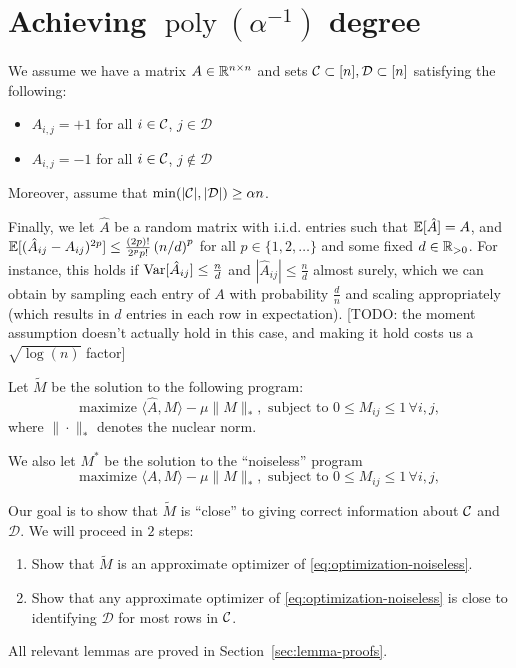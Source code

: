 \documentclass[11pt]{article}
\newcommand{\M}{\tilde{M}}
\newcommand{\A}{\hat{A}}
\DeclareMathOperator{\poly}{poly}
\newcommand{\sD}{\mathcal{D}}
\newcommand{\todo}[1]{{\color{red} [TODO: {#1}]}}
\begin{document}
\section{Achieving $\poly(\alpha^{-1})$ degree}
We assume we have a matrix $A \in \mathbb{R}^{n \times n}$ and sets 
$\sC \subset [n], \sD \subset [n]$ satisfying the following:
\begin{itemize}
\item $A_{i,j} = +1$ for all $i \in \mathcal{C}$, $j \in \sD$
\item $A_{i,j} = -1$ for all $i \in \mathcal{C}$, $j \not\in \sD$
\end{itemize}
Moreover, assume that $\min(|\sC|, |\sD|) \geq \alpha n$.

Finally, we let $\A$ be a random matrix with i.i.d. entries such that $\bE[\A] = A$, 
and $\bE[(\A_{ij}-A_{ij})^{2p}] \leq \frac{(2p)!}{2^pp!} \p{n/d}^{p}$ for all $p \in \{1,2,\ldots\}$ 
and some fixed $d \in \mathbb{R}_{>0}$. For instance, this holds if $\Var[\A_{ij}] \leq \frac{n}{d}$ and $|\A_{ij}| \leq \frac{n}{d}$ almost surely, 
which we can obtain by sampling each entry of $A$ with probability $\frac{d}{n}$ and scaling appropriately (which results in $d$ entries in 
each row in expectation).
\todo{the moment assumption doesn't actually hold in this case, and making it hold costs us a $\sqrt{\log(n)}$ factor}

Let $\M$ be the solution to the following program:
\begin{equation}
\label{eq:optimization-noisy}
\text{maximize } \langle \A, M \rangle - \mu \|M\|_*, \text{ subject to } 0 \leq M_{ij} \leq 1 \, \forall i,j,
\end{equation}
where $\|\cdot\|_*$ denotes the nuclear norm.

We also let $M^*$ be the solution to the ``noiseless'' program
\begin{equation}
\label{eq:optimization-noiseless}
\text{maximize } \langle A, M \rangle - \mu \|M\|_*, \text{ subject to } 0 \leq M_{ij} \leq 1 \, \forall i,j,
\end{equation}

Our goal is to show that $\M$ is ``close'' to giving correct information about $\mathcal{C}$ and $\sD$. 
We will proceed in $2$ steps:
\begin{enumerate}
\item Show that $\M$ is an approximate optimizer of \eqref{eq:optimization-noiseless}.
\item Show that any approximate optimizer of \eqref{eq:optimization-noiseless} is close to identifying $\sD$ for most rows in $\mathcal{C}$.
\end{enumerate}
All relevant lemmas are proved in Section~\ref{sec:lemma-proofs}.
\end{document}
